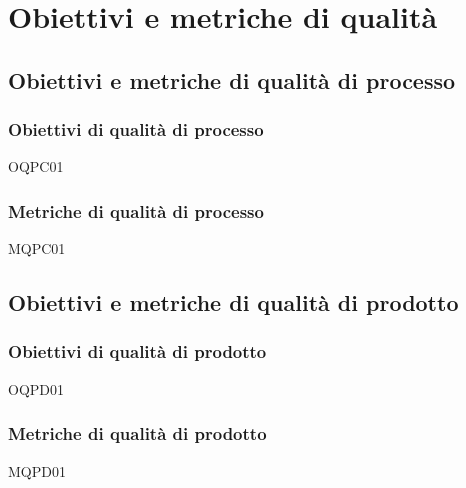 \section{Obiettivi e metriche di qualità}
\subsection{Obiettivi e metriche di qualità di processo}
\subsubsection{Obiettivi di qualità di processo}
OQPC01
\subsubsection{Metriche di qualità di processo}
MQPC01
\subsection{Obiettivi e metriche di qualità di prodotto}
\subsubsection{Obiettivi di qualità di prodotto}
OQPD01
\subsubsection{Metriche di qualità di prodotto}
MQPD01